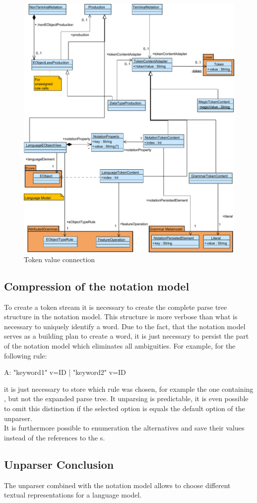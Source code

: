 \begin{figure}
\centering
\includegraphics[scale=0.68]{gfx/ex/Notation_DataLink} 
\caption{Token value connection}
\label{MM:Not:DataLink}
\end{figure}

\subsection{Compression of the notation model}
To create a token stream it is necessary to create the complete parse tree structure in the notation model. This structure is more verbose than what is necessary to uniquely identify a word. Due to the fact, that the notation model serves as a building plan to create a word, it is just necessary to persist the part of the notation model which eliminates all ambiguities. For example, for the following rule:
\begin{xtxt}
A:  "keyword1" v=ID 
 |  "keyword2" v=ID
\end{xtxt}
it is just necessary to store which rule was chosen, for example the one containing , but not the expanded parse tree. It unparsing is predictable, it is even possible to omit this distinction if the selected option is equals the default option of the unparser.  \\
It is furthermore possible to enumeration the alternatives and save their values instead of the references to the s.

\subsection{Unparser Conclusion}
The unparser combined with the notation model allows to choose different textual representations for a language model. 



